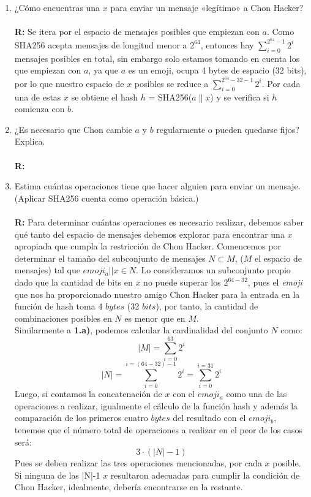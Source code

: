 \documentclass[14pt]{article}
\begin{document}
\begin{enumerate}[label=\alph*)]
\item ¿Cómo encuentras una $x$ para enviar un mensaje «legítimo» a Chon Hacker? \\ \\
\textbf{R:} Se itera por el espacio de mensajes posibles que empiezan con $a$. Como SHA256 acepta mensajes de longitud menor a $2^{64}$, entonces hay $\sum_{i = 0}^{2^{64} - 1} 2^i$ mensajes posibles en total, sin embargo solo estamos tomando en cuenta los que empiezan con $a$, ya que $a$ es un emoji, ocupa 4 bytes de espacio (32 bits), por lo que nuestro espacio de $x$ posibles se reduce a $\sum_{i = 0}^{2^{64} - 32 - 1} 2^i$. Por cada una de estas $x$ se obtiene el hash $h$ = SHA256($a \parallel x$)  y se verifica si $h$ comienza con $b$.

\item ¿Es necesario que Chon cambie $a$ y $b$ regularmente o pueden quedarse fijos? Explica. \\ \\
  \textbf{R:}  
  
\item Estima cuántas operaciones tiene que hacer alguien para enviar un mensaje. (Aplicar SHA256 cuenta como operación básica.) \\ \\
  \textbf{R:}
  Para determinar cuántas operaciones es necesario realizar, debemos saber qué tanto del espacio de mensajes debemos explorar para encontrar una $x$ apropiada que cumpla la restricción de Chon Hacker.
  Comencemos por determinar el
  tamaño del subconjunto de mensajes $N \subset M$, ($M$ el espacio de mensajes) tal que $emoji_a || x \in N$. Lo consideramos un subconjunto
  propio dado que la cantidad de bits en $x$ no puede superar los $2^{64-32}$, pues el \textit{emoji}
  que nos ha proporcionado nuestro amigo Chon Hacker para la entrada en la función de hash toma 4 $bytes$ (32 $bits$), por tanto, la cantidad de combinaciones posibles en $N$ es menor que en $M$.\\
  
  Similarmente a \textbf{1.a)}, podemos calcular la cardinalidad del conjunto $N$ como:
  \begin{equation}
    |M| = \sum_{i = 0}^{63} 2^i
  \end{equation}
  \begin{equation}
    |N| = \sum_{i = 0}^{i = (64-32)-1}2^i = \sum_{i = 0}^{i = 31}2^i
  \end{equation}
  Luego, si contamos la concatenación de $x$ con el $emoji_a$ como una de las operaciones a realizar, igualmente el cálculo de la función hash y además la comparación de los primeros cuatro $bytes$
  del resultado con el $emoji_b$, tenemos que el número total de operaciones a realizar en el
  peor de los casos será:
  \begin{equation}
    3 \cdot (|N| - 1)
  \end{equation}
  Pues se deben realizar las tres operaciones mencionadas, por cada $x$ posible. Si ninguna de
  las |N|-1 $x$ resultaron adecuadas para cumplir la condición de Chon Hacker, idealmente, debería
  encontrarse en la restante.\\
  

\end{enumerate}
\end{document}
